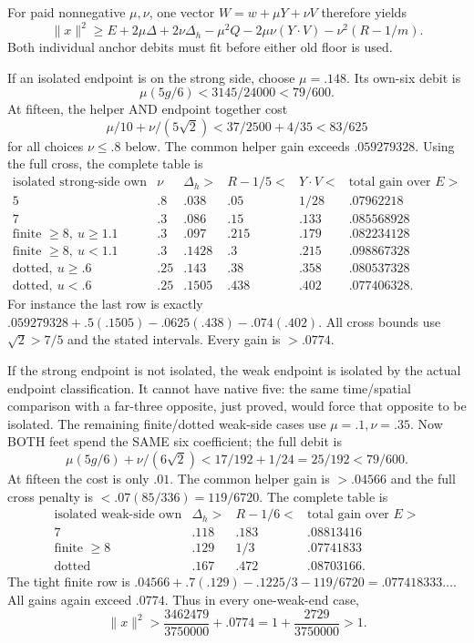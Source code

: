 \documentclass[11pt]{article}
\theoremstyle{definition}
\theoremstyle{remark}
\begin{document}
For paid nonnegative \(\mu,\nu\),
one vector \(W=w+\mu Y+\nu V\)
therefore yields
\[
 \|x\|^2\ge E+2\mu\Delta+2\nu\Delta_h
           -\mu^2Q-2\mu\nu(Y\cdot V)-\nu^2(R-1/m).
\tag{A19joint}\label{app:exact19:eq:Ajoint}
\]
Both individual anchor debits must
fit before either old floor is used.

If an isolated endpoint is on the
strong side, choose \(\mu=.148\).
Its own-six debit is
\[
                       \mu(5g/6)<3145/24000<79/600 .
\]
At fifteen, the helper AND endpoint
together cost
\[
       \mu/10+\nu/(5\sqrt2)
              <37/2500+4/35<83/625
\]
for all choices \(\nu\le.8\) below.
The common helper gain exceeds
\(.059279328\).
Using the full cross, the complete
table is
\[
\begin{array}{c|c|c|c|c|c}
 \text{isolated strong-side own}&\nu&
 \Delta_h>&R-1/5<&Y\cdot V<&\text{total gain over }E>\\ \hline
 5&.8&.038&.05&1/28&.07962218\\
 7&.3&.086&.15&.133&.085568928\\
 \text{finite }\ge8,\ u\ge1.1&.3&.097&.215&.179&.082234128\\
 \text{finite }\ge8,\ u<1.1&.3&.1428&.3&.215&.098867328\\
 \text{dotted},\ u\ge.6&.25&.143&.38&.358&.080537328\\
 \text{dotted},\ u<.6&.25&.1505&.438&.402&.077406328 .
\end{array}
\]
For instance the last row is exactly
\(.059279328+.5(.1505)-.0625(.438)-.074(.402)\).
All cross bounds use \(\sqrt2>7/5\)
and the stated intervals.
Every gain is \(>.0774\).

If the strong endpoint is not
isolated, the weak endpoint is
isolated by the actual endpoint
classification.
It cannot have native five:
the same time/spatial comparison
with a far-three opposite, just
proved, would force that opposite
to be isolated.
The remaining finite/dotted
weak-side cases use
\(\mu=.1,\nu=.35\).
Now BOTH feet spend the SAME
six coefficient; the full debit is
\[
 \mu(5g/6)+\nu/(6\sqrt2)
                   <17/192+1/24=25/192<79/600 .
\]
At fifteen the cost is only \(.01\).
The common helper gain is \(>.04566\)
and the full cross penalty is
\(<.07(85/336)=119/6720\).
The complete table is
\[
\begin{array}{c|c|c|c}
 \text{isolated weak-side own}&\Delta_h>&R-1/6<&
                                    \text{total gain over }E>\\ \hline
 7&.118&.183&.08813416\\
 \text{finite }\ge8&.129&1/3&.07741833\\
 \text{dotted}&.167&.472&.08703166 .
\end{array}
\]
The tight finite row is
\(.04566+.7(.129)-.1225/3-119/6720
=.077418333\ldots\).
All gains again exceed \(.0774\).
Thus in every one-weak-end case,
\[
              \|x\|^2>{\frac{3462479}{3750000}}+.0774
                       =1+{\frac{2729}{3750000}}>1 .
\]
\end{document}
